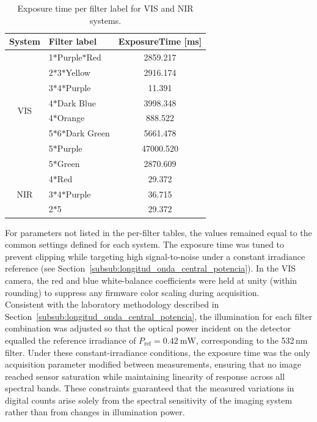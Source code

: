 \begin{table}[H]
    \centering
    \caption{Exposure time per filter label for VIS and NIR systems.}
    \label{tab:sr_perfilter_combined}
    \begin{tabular}{|c|l|c|}
        \hline
        \rowcolor[HTML]{EFEFEF}\textbf{System} & \textbf{Filter label} & \textbf{ExposureTime [ms]} \\ \hline
        \multirow{8}{*}{VIS} 
            & 1$\ast$Purple$\ast$Red        & 2859.217 \\ \cline{2-3}
            & 2$\ast$3$\ast$Yellow          & 2916.174 \\ \cline{2-3}
            & 3$\ast$4$\ast$Purple          & 11.391 \\ \cline{2-3}
            & 4$\ast$Dark Blue              & 3998.348 \\ \cline{2-3}
            & 4$\ast$Orange                 & 888.522 \\ \cline{2-3}
            & 5$\ast$6$\ast$Dark Green      & 5661.478 \\ \cline{2-3}
            & 5$\ast$Purple                 & 47000.520 \\ \cline{2-3}
            & 5$\ast$Green                  & 2870.609 \\ \hline
        \multirow{3}{*}{NIR} 
            & 4$\ast$Red                    & 29.372 \\ \cline{2-3}
            & 3$\ast$4$\ast$Purple          & 36.715 \\ \cline{2-3}
            & 2$\ast$5                      & 29.372 \\ \hline
    \end{tabular}
\end{table}

\noindent
For parameters not listed in the per-filter tables, the values remained equal to the common settings defined for each system. The exposure time was tuned to prevent clipping while targeting high signal-to-noise under a constant irradiance reference (see Section~\ref{subsub:longitud_onda_central_potencia}). In the VIS camera, the red and blue white-balance coefficients were held at unity (within rounding) to suppress any firmware color scaling during acquisition. \\

\noindent
Consistent with the laboratory methodology described in Section~\ref{subsub:longitud_onda_central_potencia}, the illumination for each filter combination was adjusted so that the optical power incident on the detector equalled the reference irradiance of \(P_{\mathrm{ref}} = 0.42~\mathrm{mW}\), corresponding to the 532\,nm filter. Under these constant-irradiance conditions, the exposure time was the only acquisition parameter modified between measurements, ensuring that no image reached sensor saturation while maintaining linearity of response across all spectral bands. These constraints guaranteed that the measured variations in digital counts arise solely from the spectral sensitivity of the imaging system rather than from changes in illumination power.



